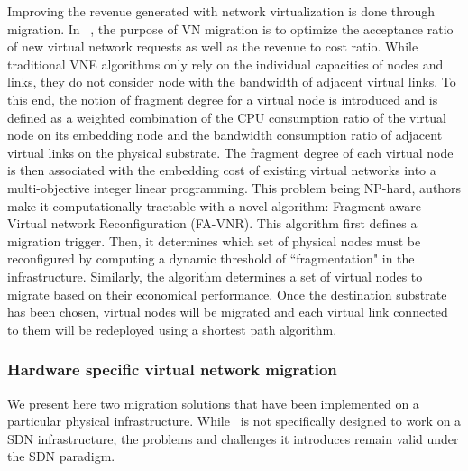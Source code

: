 Improving the revenue generated with network virtualization is done through migration.
In ~\cite{fragment-Liu2018}, the purpose of VN migration is to optimize the acceptance ratio of new virtual network requests as well as the revenue to cost ratio.
While traditional VNE algorithms only rely on the individual capacities of nodes and links, they do not consider node with the bandwidth of adjacent virtual links.
To this end, the notion of fragment degree for a virtual node is introduced and is defined as a weighted combination of the CPU consumption ratio of the virtual node on its embedding node and the bandwidth consumption ratio of adjacent virtual links on the physical substrate.
The fragment degree of each virtual node is then associated with the embedding cost of existing virtual networks into a multi-objective integer linear programming. This problem being NP-hard, authors make it computationally tractable with a novel algorithm: Fragment-aware Virtual network Reconfiguration (FA-VNR).
This algorithm first defines a migration trigger. 
Then, it determines which set of physical nodes must be reconfigured by computing a dynamic threshold of ``fragmentation" in the infrastructure.
Similarly, the algorithm determines a set of virtual nodes to migrate based on their economical performance.
Once the destination substrate has been chosen, virtual nodes will be migrated and each virtual link connected to them will be redeployed using a shortest path algorithm.

\subsubsection{Hardware specific virtual network migration}
We present here two migration solutions that have been implemented on a particular physical infrastructure.
While~\cite{Lo2014} is not specifically designed to work on a SDN infrastructure, the problems and challenges it introduces remain valid under the SDN paradigm.

